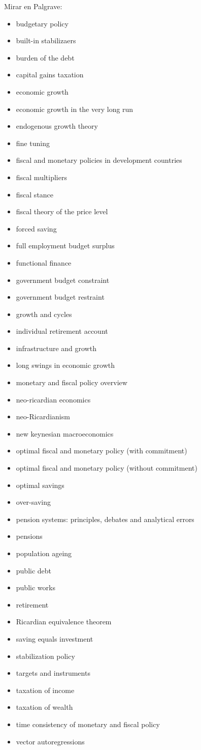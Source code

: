 \documentclass{nuevotema}
\begin{document}
Mirar en Palgrave:
\begin{itemize}
	\item budgetary policy
	\item built-in stabilizaers
	\item burden of the debt
	\item capital gains taxation
	\item economic growth
	\item economic growth in the very long run
	\item endogenous growth theory
	\item fine tuning
	\item fiscal and monetary policies in development countries
	\item fiscal multipliers
	\item fiscal stance
	\item fiscal theory of the price level
	\item forced saving
	\item full employment budget surplus
	\item functional finance
	\item government budget constraint
	\item government budget restraint
	\item growth and cycles
	\item individual retirement account
	\item infrastructure and growth
	\item long swings in economic growth
	\item monetary and fiscal policy overview
	\item neo-ricardian economics
	\item neo-Ricardianism
	\item new keynesian macroeconomics
	\item optimal fiscal and monetary policy (with commitment)
	\item optimal fiscal and monetary policy (without commitment)
	\item optimal savings
	\item over-saving
	\item pension systems: principles, debates and analytical errors
	\item pensions
	\item population ageing
	\item public debt
	\item public works
	\item retirement
	\item Ricardian equivalence theorem
	\item saving equals investment
	\item stabilization policy
	\item targets and instruments
	\item taxation of income
	\item taxation of wealth
	\item time consistency of monetary and fiscal policy
	\item vector autoregressions
\end{itemize}
\end{document}
